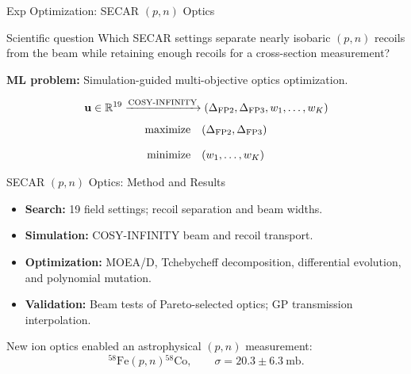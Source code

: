 \begin{frame}[c,label=md-37]{Exp Optimization: SECAR $(p,n)$ Optics}
\small
\begin{block}{Scientific question}
Which SECAR settings separate nearly isobaric $(p,n)$ recoils from the beam
while retaining enough recoils for a cross-section measurement?
\end{block}
\smallskip
\textbf{ML problem:} Simulation-guided multi-objective optics optimization.
\vspace{0.3cm}

\medskip
\[
\mathbf u\in\mathbb R^{19}\xrightarrow{\text{COSY-INFINITY}}
(\Delta_{\rm FP2},\Delta_{\rm FP3},w_1,\ldots,w_K)
\]
\vspace{0.12cm}
\[
\begin{aligned}
\text{maximize}\quad & (\Delta_{\rm FP2},\Delta_{\rm FP3}) \\[0.8em]
\text{minimize}\quad & (w_1,\ldots,w_K)
\end{aligned}
\]
\end{frame}

\begin{frame}[t,label=md-38]{SECAR $(p,n)$ Optics: Method and Results}
\small
{}
\smallskip
\begin{itemize}
\setlength{\itemsep}{0.45em}
    \item \textbf{Search:} 19 field settings; recoil separation and beam widths.
    \item \textbf{Simulation:} COSY-INFINITY beam and recoil transport.
    \item \textbf{Optimization:} MOEA/D, Tchebycheff decomposition, differential evolution, and polynomial mutation.
    \item \textbf{Validation:} Beam tests of Pareto-selected optics; GP transmission interpolation.
\end{itemize}
\medskip
{}
\smallskip

New ion optics enabled an astrophysical $(p,n)$ measurement:
\[
{}^{58}\mathrm{Fe}(p,n){}^{58}\mathrm{Co},\qquad
\boxed{\sigma=20.3\pm6.3\ \mathrm{mb}}.
\]
\end{frame}


